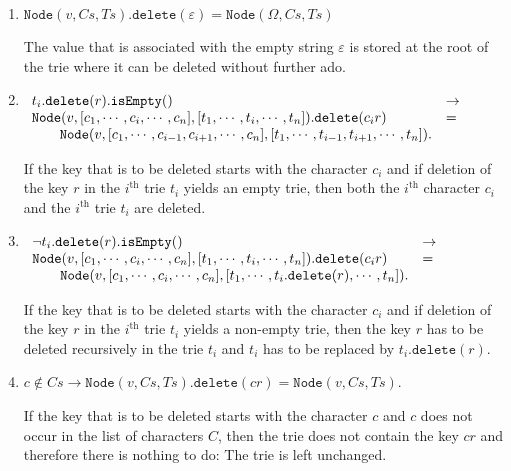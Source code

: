 \begin{enumerate}
\item $\texttt{Node}(v,C\!s,T\!s).\texttt{delete}(\varepsilon) = \texttt{Node}(\Omega,C\!s,T\!s)$

      The value that is associated with the empty  string $\varepsilon$ is stored at the root of the
      trie where it can be deleted without further ado.
\item $\begin{array}[t]{ll}
       t_i.\texttt{delete}(r).\texttt{isEmpty}()   & \rightarrow \\
       \texttt{Node}(v, [c_1,\cdots,c_i,\cdots,c_n],[t_1,\cdots,t_i,\cdots,t_n]).\texttt{delete}(c_ir) 
       & = \\
       \qquad 
       \texttt{Node}(v, [c_1,\cdots,c_{i-1},c_{i+1},\cdots,c_n],[t_1,\cdots,t_{i-1},t_{i+1},\cdots,t_n]).
       \end{array}
       $

       If  the key that is to be deleted starts with the character $c_i$ and if deletion of  the key
       $r$ in the $i^\textrm{th}$  trie $t_i$ yields an empty
       trie, then both the $i^\textrm{th}$ character $c_i$ and the $i^\textrm{th}$ trie $t_i$ are deleted.
\item $\begin{array}[t]{ll}
       \neg t_i.\texttt{delete}(r).\texttt{isEmpty}()   & \rightarrow \\
       \texttt{Node}(v, [c_1,\cdots,c_i,\cdots,c_n],[t_1,\cdots,t_i,\cdots,t_n]).\texttt{delete}(c_ir) 
       & = \\
       \qquad \texttt{Node}(v, [c_1,\cdots,c_i,\cdots,c_n],[t_1,\cdots,t_i.\texttt{delete}(r),\cdots,t_n]).
       \end{array}
       $

       If  the key that is to be deleted starts with the character $c_i$ and if deletion of  the key
       $r$ in the $i^\textrm{th}$  trie $t_i$ yields a non-empty trie, then the key $r$ has to be deleted recursively
       in the trie $t_i$ and $t_i$ has to be replaced by $t_i.\texttt{delete}(r)$.
\item $c \notin C\!s \rightarrow \texttt{Node}(v, C\!s, T\!s).\texttt{delete}(cr) =
       \texttt{Node}(v, C\!s, T\!s)$. 
       
       If  the key that is to be deleted starts with the character $c$ and $c$ does not occur in
       the list of characters $C$, then the trie does not contain the key $cr$ and therefore there
       is nothing to do:  The trie is left unchanged.
\end{enumerate}

